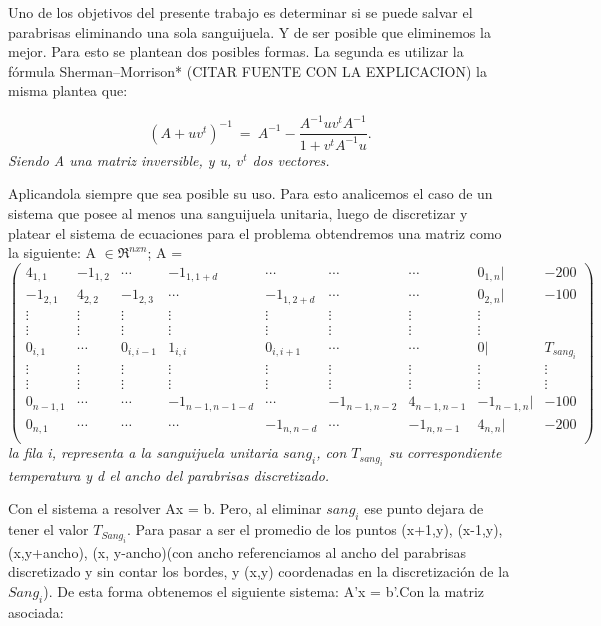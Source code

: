 Uno de los objetivos del presente trabajo es determinar si se puede salvar el parabrisas eliminando una sola sanguijuela. Y de ser posible que eliminemos la mejor. Para esto se plantean dos posibles formas. La segunda es utilizar la fórmula Sherman–Morrison* (CITAR FUENTE CON LA EXPLICACION) la misma plantea que:

\begin{equation}
	(A+ uv^t)^{-1} \ =\ A^{-1} - \frac{ A^{-1} u v^t A^{-1} }{1+v^t A^{-1}u}.\label{eq:sm}
\end{equation} 
\textit{Siendo A una matriz inversible, y u, $v^t$ dos vectores.}


Aplicandola siempre que sea posible su uso. Para esto analicemos el caso de un sistema que posee al menos una sanguijuela unitaria, luego de discretizar y platear el sistema de ecuaciones para el problema obtendremos una matriz como la siguiente:
A $\in \Re ^{nxn}$; A =
$$
 \begin{pmatrix}
  4_{1,1} & -1_{1,2} & \cdots & -1_{1,1+d} & \cdots & \cdots & \cdots & 0_{1,n} | & -200 \\
   -1_{2,1} & 4_{2,2} & -1_{2,3} & \cdots & -1_{1,2+d} & \cdots & \cdots  & 0_{2,n} | & -100 \\
  \vdots  & \vdots  & \vdots & \vdots  & \vdots & \vdots  & \vdots & \vdots \\
  \vdots  & \vdots & \vdots & \vdots  & \vdots & \vdots  & \vdots & \vdots \\
   0_{i,1} & \cdots & 0_{i,i-1} & 1_{i,i} &  0_{i,i+1} & \cdots & \cdots & 0 | & T_{sang_i} \\
  \vdots  & \vdots  & \vdots & \vdots  & \vdots  & \vdots  & \vdots & \vdots & \vdots\\
  \vdots  & \vdots  & \vdots & \vdots  & \vdots  & \vdots  & \vdots & \vdots & \vdots\\
   0_{n-1,1} & \cdots & \cdots & -1_{n-1,n-1-d} & \cdots & -1_{n-1,n-2} & 4_{n-1,n-1} &  -1_{n-1,n} | & -100 \\
   0_{n,1} & \cdots & \cdots & \cdots & -1_{n,n-d} & \cdots & -1_{n,n-1} &  4_{n,n} | & -200 \\
 \end{pmatrix}
$$
\textit{la fila i, representa a la sanguijuela unitaria $sang_i$, con $T_{sang_i}$ su correspondiente temperatura y d el ancho del parabrisas discretizado.}\newline

Con el sistema a resolver Ax = b.\newline
Pero, al eliminar $sang_i$ ese punto dejara de tener el valor $T_{Sang_i}$. Para pasar a ser el promedio de los puntos (x+1,y), (x-1,y), (x,y+ancho), (x, y-ancho)(con ancho referenciamos al ancho del parabrisas discretizado y sin contar los bordes,  y (x,y) coordenadas en la discretizaci\'on de la $Sang_i$). De esta forma obtenemos el siguiente sistema: A'x = b'.\newline Con la matriz asociada:


